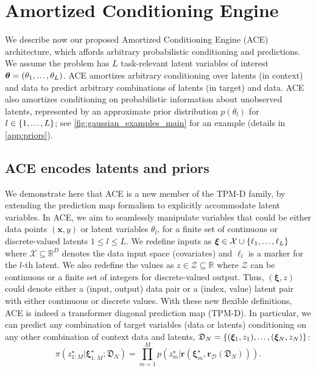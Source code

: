 \documentclass[twoside]{article}
\renewcommand{\r}{\mathbf{r}}
\newcommand{\vtheta}{{\bm{\theta}}}
\newcommand{\vxi}{\bm{\xi}}
\renewcommand{\ldots}{\mathinner{.\mkern1.5mu.\mkern1.5mu.}}
\newcommand{\x}{\mathbf{x}}
\newcommand{\data}{\mathcal{D}}
\newcommand{\dataplus}{\mathfrak{D}} %
\newcommand{\zt}{{z}^\star}
\newcommand{\vxit}{\bm{\xi}^\star}
\newcommand{\XX}{\mathcal{X}}
\begin{document}
\section{Amortized Conditioning Engine}
\label{sec:ace}

We describe now our proposed Amortized Conditioning Engine (ACE) architecture, which affords arbitrary probabilistic conditioning and predictions. We assume the problem has $ L$ task-relevant latent variables of interest $ \vtheta = (\theta_1, \ldots, \theta_L) $. ACE amortizes arbitrary conditioning over  latents (in context) and data to predict arbitrary combinations of latents (in target)  and data.
ACE also amortizes conditioning on probabilistic information about unobserved latents, represented by an approximate prior distribution $p(\theta_l)$ for $l \in \{1, \ldots, L\}$; see  \cref{fig:gaussian_examples_main} for an example (details in \cref{app:priors}).

\subsection{ACE encodes latents and priors}
\label{sec:latentspriors}

We demonstrate here that ACE is a new member of the TPM-D family, by extending the prediction map formalism to explicitly accommodate latent variables.
In ACE, we aim to seamlessly manipulate variables that could be either data points $(\x, y)$ or latent variables $\theta_l$, for a finite set of continuous or discrete-valued latents $1 \le l\le L$.
%
We redefine inputs as $\vxi \in  \XX \cup \{\ell_1, \ldots, \ell_L \}$ where $\XX \subseteq \mathbb{R}^D$ denotes the data input space (covariates) and $\ell_l$ is a marker for the $l$-th latent. We also redefine the values as $z \in \mathcal{Z} \subseteq \mathbb{R}$ where $\mathcal{Z}$ can be continuous or a finite set of integers for discrete-valued output.
Thus,  $(\vxi, z)$ could denote either a  (input, output) data pair or a (index, value) latent pair with either continuous or discrete values. With these new flexible definitions, ACE is indeed a transformer diagonal prediction map (TPM-D). In particular, we can predict any combination of target variables (data or latents) conditioning on any other combination of context data and latents, $\dataplus_N = \left\{(\vxi_1, z_1), \ldots, (\vxi_N, z_N)\right\}$:
\begin{equation} 
\label{eq:ace_map}
 \pi(\zt_{1:M} \vert \vxit_{1:M}; \dataplus_N ) = 
 \prod_{m=1}^M p\left(\zt_m| \r(\vxit_m, \r_{\data}(\dataplus_N))\right).
\end{equation}
\end{document}
